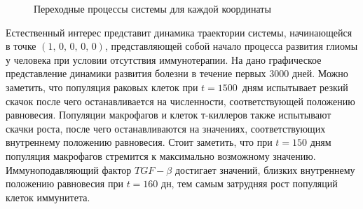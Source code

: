 \documentclass[14pt,a4paper]{extarticle}
\begin{document}
\begin{example}
\begin{figure}[h]
			\caption{Переходные процессы системы для каждой координаты}
			\label{fig:in_D}
		\end{figure}
		
		Естественный интерес представит динамика траектории системы, начинающейся в точке $\left(1,\,0,\,0,\,0,\,0\right)$, представляющей собой начало процесса развития глиомы у человека при условии отсутствия иммунотерапии. На  дано графическое представление динамики развития болезни в течение первых 3000 дней. Можно заметить, что популяция раковых клеток при $t=1500$~дням испытывает резкий скачок после чего останавливается на численности, соответствующей положению равновесия. Популяции макрофагов и клеток т-киллеров также испытывают скачки роста, после чего останавливаются на значениях, соответствующих внутреннему положению равновесия. Стоит заметить, что при $t=150$ дням популяция макрофагов стремится к максимально возможному значению. Иммуноподавляющий фактор $TGF-\beta$ достигает значений, близких внутреннему положению равновесия при $t=160$ дн, тем самым затрудняя рост популяций клеток иммунитета.
		

\end{example}
\end{document}
